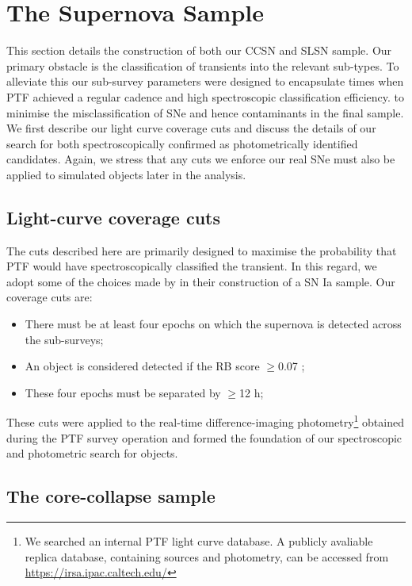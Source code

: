 \documentclass[a4paper,fleqn,usenatbib]{mnras}
\begin{document}
\section{The Supernova Sample}

This section details the construction of both our CCSN and SLSN sample. Our primary obstacle is the classification of transients into the relevant sub-types. To alleviate this our sub-survey parameters were designed to encapsulate times when PTF achieved a regular cadence and high spectroscopic classification efficiency.  to minimise the misclassification of SNe and hence contaminants in the final sample. We first describe our light curve coverage cuts and discuss the details of our search for both spectroscopically confirmed as photometrically identified candidates. Again, we stress that any cuts we enforce our real SNe must also be applied to simulated objects later in the analysis.

\subsection{Light-curve coverage cuts}
\label{sec:coverage_cuts}

The cuts described here are primarily designed to maximise the probability that PTF would have spectroscopically classified the transient. In this regard, we adopt some of the choices made by \citet{Frohmaier19} in their construction of a SN Ia sample. Our coverage cuts are:

\begin{itemize}
    \item There must be at least four epochs on which the supernova is detected across the sub-surveys;
    \item An object is considered detected if the RB score $\ge$0.07 \citep{Bloom};
    \item These four epochs must be separated by $\ge$12 h;
\end{itemize}

These cuts were applied to  the real-time difference-imaging photometry\footnote{We searched an internal PTF light curve database. A publicly avaliable replica database, containing sources and photometry, can be accessed from \url{https://irsa.ipac.caltech.edu/} } obtained during the PTF survey operation and formed the foundation of our spectroscopic and photometric search for objects.

\subsection{The core-collapse sample}
\label{sec:CCSample}
\end{document}
